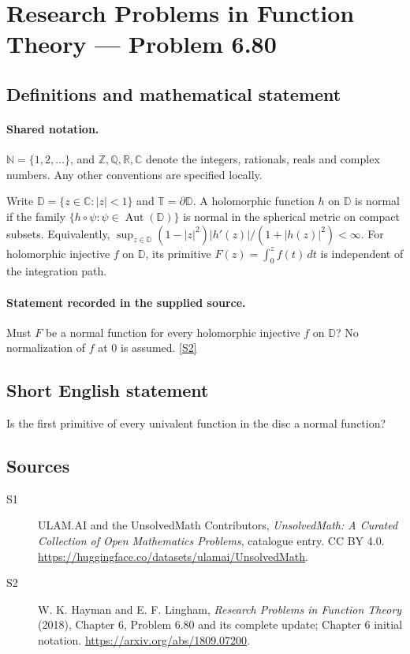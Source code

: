 \documentclass[11pt]{article}
\newcommand{\sref}[2]{\hyperlink{source:#1:#2}{[S#2]}}
\begin{document}
\section{Research Problems in Function Theory — Problem 6.80}\label{statement}

\subsection{Definitions and mathematical statement}

\paragraph{Shared notation.}$\mathbb N=\{1,2,\ldots\}$, and $\mathbb Z,\mathbb Q,\mathbb R,\mathbb C$ denote the integers, rationals, reals and complex numbers. Any other conventions are specified locally.


Write $\mathbb D=\{z\in\mathbb C:|z|<1\}$ and $\mathbb T=\partial\mathbb D$. A holomorphic function $h$ on $\mathbb D$ is normal if the family $\{h\circ\psi:\psi\in\operatorname{Aut}(\mathbb D)\}$ is normal in the spherical metric on compact subsets. Equivalently, $\sup_{z\in\mathbb D}(1-|z|^2)|h'(z)|/(1+|h(z)|^2)<\infty$. For holomorphic injective $f$ on $\mathbb D$, its primitive $F(z)=\int_0^z f(t)\,dt$ is independent of the integration path.
\paragraph{Statement recorded in the supplied source.}
Must $F$ be a normal function for every holomorphic injective $f$ on $\mathbb D$? No normalization of $f$ at $0$ is assumed. \sref{statement}{2}
\subsection{Short English statement}
Is the first primitive of every univalent function in the disc a normal function?
\subsection{Sources}
\begin{description}
\item[\hypertarget{source:statement:1}{S1}] ULAM.AI and the UnsolvedMath Contributors, \emph{UnsolvedMath: A Curated Collection of Open Mathematics Problems}, catalogue entry. CC BY 4.0. \url{https://huggingface.co/datasets/ulamai/UnsolvedMath}.
\item[\hypertarget{source:statement:2}{S2}] W. K. Hayman and E. F. Lingham, \emph{Research Problems in Function Theory} (2018), Chapter 6, Problem 6.80 and its complete update; Chapter 6 initial notation. \url{https://arxiv.org/abs/1809.07200}.
\end{description}
\label{end:statement}
\end{document}
